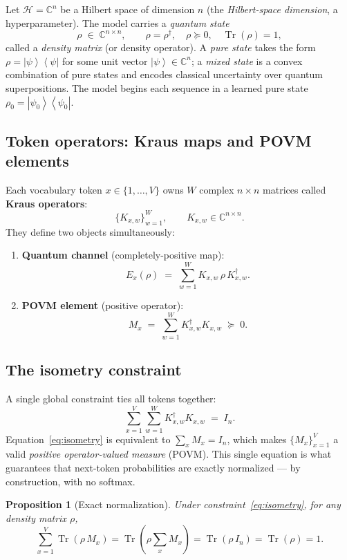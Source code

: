 \documentclass[11pt,a4paper]{article}
\newcommand{\Tr}{\operatorname{Tr}}
\newcommand{\ket}[1]{\left|#1\right\rangle}
\newcommand{\bra}[1]{\left\langle#1\right|}
\newcommand{\CC}{\mathbb{C}}
\newcommand{\Hilbert}{\mathcal{H}}
\newcommand{\Kx}[2]{K_{#1,#2}}     %
\newcommand{\Ex}[1]{E_{#1}}         %
\newcommand{\Mx}[1]{M_{#1}}         %
\theoremstyle{plain}
\newtheorem{proposition}{Proposition}
\begin{document}
Let $\Hilbert = \CC^n$ be a Hilbert space of dimension $n$ (the
\emph{Hilbert-space dimension}, a hyperparameter). The model carries a
\emph{quantum state}
\[
  \rho \;\in\; \CC^{n\times n}, \qquad
  \rho = \rho^\dagger, \quad
  \rho \succeq 0, \quad
  \Tr(\rho) = 1,
\]
called a \emph{density matrix} (or density operator). A
\emph{pure state} takes the form $\rho = \ket{\psi}\!\bra{\psi}$ for
some unit vector $\ket{\psi}\in\CC^n$; a \emph{mixed state} is a convex
combination of pure states and encodes classical uncertainty over
quantum superpositions. The model begins each sequence in a learned
pure state $\rho_0 = \ket{\psi_0}\!\bra{\psi_0}$.

\subsection{Token operators: Kraus maps and POVM elements}

Each vocabulary token $x \in \{1,\ldots,V\}$ owns $W$ complex
$n\times n$ matrices called \textbf{Kraus operators}:
\[
  \bigl\{\Kx{x}{w}\bigr\}_{w=1}^{W}, \qquad \Kx{x}{w}\in\CC^{n\times n}.
\]
They define two objects simultaneously:

\begin{enumerate}
\item \textbf{Quantum channel} (completely-positive map):
\[
  \Ex{x}(\rho) \;=\; \sum_{w=1}^{W} \Kx{x}{w}\,\rho\,\Kx{x}{w}^\dagger.
\]

\item \textbf{POVM element} (positive operator):
\[
  \Mx{x} \;=\; \sum_{w=1}^{W} \Kx{x}{w}^\dagger \Kx{x}{w} \;\succeq\; 0.
\]
\end{enumerate}

\subsection{The isometry constraint}

A single global constraint ties all tokens together:
\begin{equation}\label{eq:isometry}
  \sum_{x=1}^{V}\sum_{w=1}^{W} \Kx{x}{w}^\dagger \Kx{x}{w} \;=\; I_n.
\end{equation}
Equation~\eqref{eq:isometry} is equivalent to $\sum_x \Mx{x} = I_n$,
which makes $\{\Mx{x}\}_{x=1}^{V}$ a valid \emph{positive
operator-valued measure} (POVM). This single equation is what
guarantees that next-token probabilities are exactly normalized --- by
construction, with no softmax.

\begin{proposition}[Exact normalization]
Under constraint~\eqref{eq:isometry}, for any density matrix $\rho$,
\[
  \sum_{x=1}^{V} \Tr(\rho\,\Mx{x})
  = \Tr\!\left(\rho \sum_x \Mx{x}\right)
  = \Tr(\rho\, I_n)
  = \Tr(\rho)
  = 1.
\]
\end{proposition}
\end{document}
